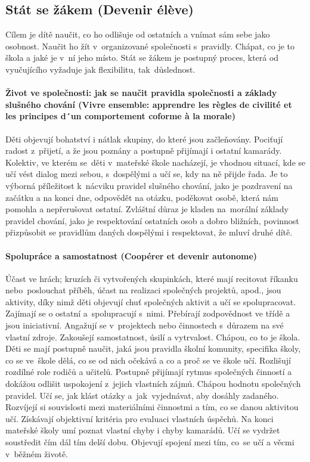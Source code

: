 		\subsection{Stát se žákem (Devenir élève)}
			Cílem je dítě naučit, co ho odlišuje od ostatních a vnímat sám sebe jako osobnost. Naučit ho žít v organizované společnosti s pravidly. Chápat, co je to škola a jaké je v ní jeho místo. Stát se žákem je postupný proces, která od vyučujícího vyžaduje jak flexibilitu, tak důslednost.
			\paragraph{Život ve společnosti: jak se naučit pravidla společnosti a základy slušného chování (Vivre ensemble: apprendre les règles de civilité et les principes d´un comportement coforme à la morale)}
				Děti objevují bohatství i nátlak skupiny, do které jsou začleňovány. Pociťují radost z přijetí, a že jsou poznány a postupně přijímají i ostatní kamarády. Kolektiv, ve kterém se děti v mateřské škole nacházejí, je vhodnou situací, kde se učí vést dialog mezi sebou, s dospělými a učí se, kdy na ně přijde řada. Je to výborná příležitost k nácviku pravidel slušného chování, jako je pozdravení na začátku a na konci dne, odpovědět na otázku, poděkovat osobě, která nám pomohla a nepřerušovat ostatní. Zvláštní důraz je kladen na morální základy pravidel chování, jako je respektování ostatních osob a dobro bližních, povinnost přizpůsobit se pravidlům daných dospělými i respektovat, že mluví druhé dítě. 

			\paragraph{Spolupráce a samostatnost (Coopérer et devenir autonome)}
				Účast ve hrách; kruzích či vytvořených skupinkách, které mají recitovat říkanku nebo poslouchat příběh, účast na realizaci společných projektů, apod., jsou aktivity, díky nimž děti objevují chuť společných aktivit a učí se spolupracovat. Zajímají se o ostatní a spolupracují s nimi. Přebírají zodpovědnost ve třídě a jsou iniciativní. Angažují se v projektech nebo činnostech s důrazem na své vlastní zdroje. Zakoušejí samostatnost, úsilí a vytrvalost. Chápou, co to je škola.
				Děti se mají postupně naučit, jaká jsou pravidla školní komunity, specifika školy, co se ve škole dělá, co se od nich očekává a co a proč se ve škole učí. Rozlišují rozdílné role rodičů a učitelů. 
				Postupně přijímají rytmus společných činností a dokážou odlišit uspokojení z jejich vlastních zájmů. Chápou hodnotu společných pravidel. Učí se, jak klást otázky a jak vyjednávat, aby dosáhly zadaného. Rozvíjejí si souvislosti mezi materiálními činnostmi a tím, co se danou aktivitou učí. Získávají objektivní kritéria pro evaluaci vlastních úspěchů. Na konci mateřské školy umí poznat vlastní chyby i chyby kamarádů. Učí se vydržet soustředit čím dál tím delší dobu. Objevují spojení mezi tím, co se učí a věcmi v běžném životě.
